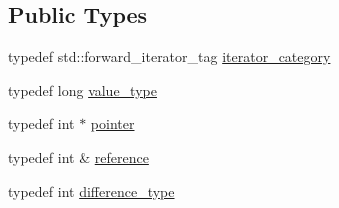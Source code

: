 \subsection*{Public Types}
\begin{DoxyCompactItemize}
\item 
typedef std::forward\_\-iterator\_\-tag \hyperlink{classMadara_1_1Expression__Tree_1_1Expression__Tree__Const__Iterator_ae653a4e600bab2c68c253caa1941693f}{iterator\_\-category}
\item 
typedef long \hyperlink{classMadara_1_1Expression__Tree_1_1Expression__Tree__Const__Iterator_a03a54ac5cdb47a9db29d4743aebfb545}{value\_\-type}
\item 
typedef int $\ast$ \hyperlink{classMadara_1_1Expression__Tree_1_1Expression__Tree__Const__Iterator_a22ed6a40941932495749065d275a0d49}{pointer}
\item 
typedef int \& \hyperlink{classMadara_1_1Expression__Tree_1_1Expression__Tree__Const__Iterator_a64aac480c78275a3ac8ed1fb7b062566}{reference}
\item 
typedef int \hyperlink{classMadara_1_1Expression__Tree_1_1Expression__Tree__Const__Iterator_a1071ab3eba30a4eba88c00e2ae0c2381}{difference\_\-type}
\end{DoxyCompactItemize}
